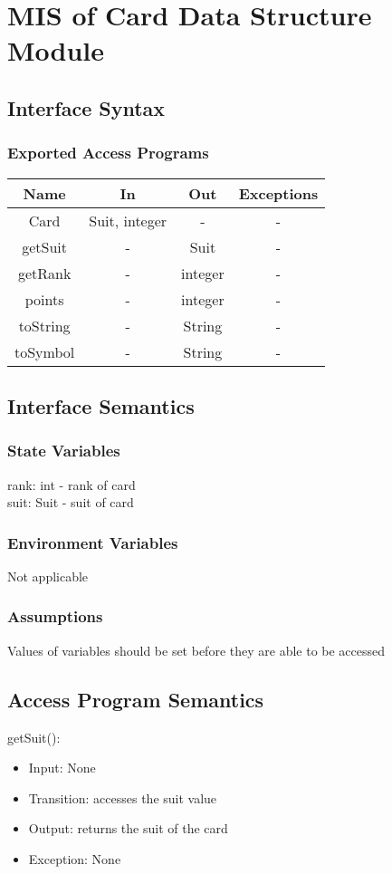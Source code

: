 \documentclass[12pt, titlepage]{article}
\begin{document}
\section{MIS of Card Data Structure Module}
\subsection{Interface Syntax}
\subsubsection{Exported Access Programs}
		\begin{tabular}[pos]{|c|c|c|c|}
			
		\hline
		\textbf{Name}& \textbf{In} & \textbf{Out} & \textbf{Exceptions} \\ \hline
		Card & Suit, integer & - & -\\ \hline
		getSuit & - & Suit & -\\ \hline
		getRank & - & integer & -\\ \hline
		points & - & integer & -\\ \hline
		toString & - & String & -\\ \hline
		toSymbol & - & String & -\\ \hline
		\end{tabular}

\subsection{Interface Semantics}
\subsubsection{State Variables}
rank: int - rank of card \\
suit: Suit - suit of card

\subsubsection{Environment Variables}
Not applicable

\subsubsection{Assumptions}
Values of variables should be set before they are able to be accessed

\subsection{Access Program Semantics}
getSuit():
\begin{itemize}
    \item Input: None
    \item Transition: accesses the suit value
    \item Output: returns the suit of the card
    \item Exception: None
\end{itemize}
\end{document}
